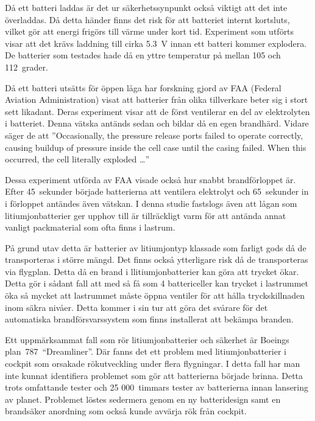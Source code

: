 \documentclass[a4paper,12pt]{article}
\begin{document}
Då ett batteri laddas är det ur säkerhetssynpunkt också viktigt att det inte överladdas. Då detta händer finns det risk för att batteriet internt kortsluts, vilket gör att energi frigörs till värme under kort tid. Experiment som utförts \cite{overcharging} visar att det krävs laddning till cirka 5.3~V innan ett batteri kommer explodera. De batterier som testades hade då en yttre temperatur på mellan 105 och 112~grader.

Då ett batteri utsätts för öppen låga har forskning gjord av FAA (Federal Aviation Administration) \cite{fire-faa} visat att batterier från olika tillverkare beter sig i stort sett likadant. Deras experiment visar att de först ventilerar en del av elektrolyten i batteriet. Denna vätska antänds sedan och bildar då en egen brandhärd. Vidare säger de att ''Occasionally, the pressure release ports failed to operate correctly, causing buildup of pressure inside the cell case until the casing failed. When this occurred, the cell literally exploded …''

Dessa experiment utförda av FAA visade också hur snabbt brandförloppet är. Efter 45~sekunder började batterierna att ventilera elektrolyt och 65~sekunder in i förloppet antändes även vätskan. I denna studie fastslogs även att lågan som litiumjonbatterier ger upphov till är tillräckligt varm för att antända annat vanligt packmaterial som ofta finns i lastrum.\cite{fire-faa}

På grund utav detta är batterier av litiumjontyp klassade som farligt gods då de transporteras i större mängd. Det finns också ytterligare risk då de transporteras via flygplan. Detta då en brand i llitiumjonbatterier kan göra att trycket ökar. Detta gör i sådant fall att med så få som 4 battericeller kan trycket i lastrummet öka så mycket att lastrummet måste öppna ventiler för att hålla tryckskillnaden inom säkra nivåer. Detta kommer i sin tur att göra det svårare för det automatiska brandförsvarssystem som finns installerat att bekämpa branden.\cite{fire-faa}

Ett uppmärksammat fall som rör litiumjonbatterier och säkerhet är Boeings plan~787~“Dreamliner”. Där fanns det ett problem med litiumjonbatterier i cockpit som orsakade rökutveckling under flera flygningar. I detta fall har man inte kunnat identifiera problemet som gör att batterierna började brinna. Detta trots omfattande tester och 25 000~timmars tester av batterierna innan lansering av planet. Problemet löstes sedermera genom en ny batteridesign samt en brandsäker anordning som också kunde avvärja rök från cockpit.\cite{dreamliner}
\end{document}

